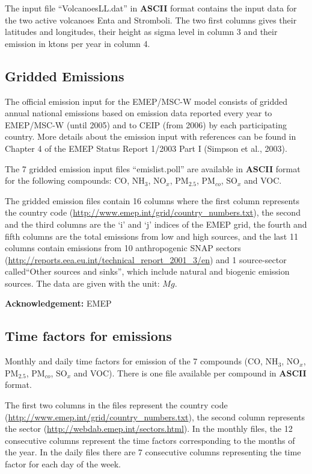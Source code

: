 The input file ``VolcanoesLL.dat'' in {\bf ASCII} format contains the input data for the two active volcanoes
 Enta and Stromboli. The two first columns gives their latitudes and longitudes, their height as sigma level
 in column 3 and their emission in ktons per year in column 4. 

\subsection{Gridded Emissions}
The official emission input for the EMEP/MSC-W model consists of
gridded 
annual national emissions based on emission data reported every year
to EMEP/MSC-W (until 2005) 
and to CEIP (from 2006) by each
participating country. 
More details about the emission input with references can be
found in Chapter 4 of the EMEP Status Report 1/2003 Part I 
(Simpson et al., 2003).

The 7 gridded emission input files ``emislist.poll'' are available in 
{\bf ASCII} format for the following compounds: CO, NH$_{3}$,
NO$_{x}$, PM$_{2.5}$, PM$_{co}$, SO$_{x}$ and VOC.

The gridded emission files contain 16 columns where the first column 
represents the country code
(\url{http://www.emep.int/grid/country_numbers.txt}), 
the second and the third columns are the `i' and `j' indices of the
EMEP grid, the fourth and fifth columns are the total emissions from
low and high sources, and the last 11 columns contain emissions from 
10 anthropogenic SNAP sectors 
(\url{http://reports.eea.eu.int/technical_report_2001_3/en}) and 1 
source-sector called``Other sources and sinks'', which include natural and
biogenic emission sources. The data are given with the unit: $Mg$.

{\bf Acknowledgement:} EMEP

\subsection{Time factors for emissions}

Monthly and daily time factors for emission of the 7 compounds 
(CO, NH$_{3}$, NO$_{x}$, PM$_{2.5}$, PM$_{co}$, SO$_{x}$ and VOC). 
There is one file available per compound in {\bf ASCII} format. 

The first two columns in the files represent the country code \\
(\url{http://www.emep.int/grid/country_numbers.txt}), the second column 
represents the sector (\url{http://webdab.emep.int/sectors.html}). In the monthly files, 
the 12 consecutive columns represent the time factors corresponding to 
the months of the year. In the daily files there are 7 consecutive columns representing 
the time factor for each day of the week. 

